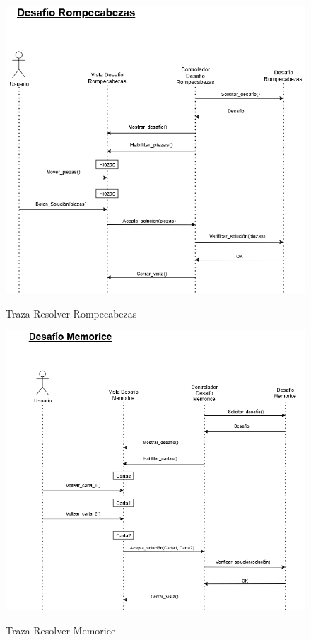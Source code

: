 \begin{figure}[H]
	\centering
	\caption{Traza Resolver Rompecabezas}
	\includegraphics[width=\textwidth]{./img/Desafio_Rompecabezas.png}
        \vspace{10pt}
	\label{fig:Traza Resolver Rompecabezas}
\end{figure}

\begin{figure}[H]
	\centering
	\caption{Traza Resolver Memorice}
	\includegraphics[width=\textwidth]{./img/Desafio_Memorice.png}
        \vspace{10pt}
	\label{fig:Traza Resolver Memorice}
\end{figure}

